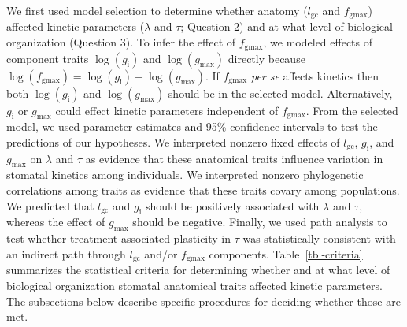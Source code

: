 \documentclass[
  letterpaper,
  DIV=11,
  numbers=noendperiod]{scrartcl}
\newcommand{\fgmax}{$f_\mathrm{gmax}$}
\newcommand{\gcl}{$l_\mathrm{gc}$}
\newcommand{\gi}{$g_\mathrm{i}$}
\newcommand{\gmax}{$g_\mathrm{max}$}
\newcommand{\loggi}{$\log(g_\mathrm{i})$}
\newcommand{\loggmax}{$\log(g_\mathrm{max})$}
\begin{document}
We first used model selection to determine whether anatomy (\gcl{} and
\fgmax) affected kinetic parameters (\(\lambda\) and \(\tau\); Question
2) and at what level of biological organization (Question 3). To infer
the effect of \fgmax{}, we modeled effects of component traits \loggi{}
and \loggmax{} directly because
\(\log \left( f_\mathrm{gmax} \right) = \log \left( g_\mathrm{i} \right) - \log \left( g_\mathrm{max} \right)\).
If \fgmax{} \emph{per se} affects kinetics then both \loggi{} and
\loggmax{} should be in the selected model. Alternatively, \gi{} or
\gmax{} could effect kinetic parameters independent of \fgmax. From the
selected model, we used parameter estimates and 95\% confidence
intervals to test the predictions of our hypotheses. We interpreted
nonzero fixed effects of \gcl{}, \gi{}, and \gmax{} on \(\lambda\) and
\(\tau\) as evidence that these anatomical traits influence variation in
stomatal kinetics among individuals. We interpreted nonzero phylogenetic
correlations among traits as evidence that these traits covary among
populations. We predicted that \gcl{} and \gi{} should be positively
associated with \(\lambda\) and \(\tau\), whereas the effect of \gmax{}
should be negative. Finally, we used path analysis to test whether
treatment-associated plasticity in \(\tau\) was statistically consistent
with an indirect path through \gcl{} and/or \fgmax{} components.
Table~\ref{tbl-criteria} summarizes the statistical criteria for
determining whether and at what level of biological organization
stomatal anatomical traits affected kinetic parameters. The subsections
below describe specific procedures for deciding whether those are met.
\end{document}

